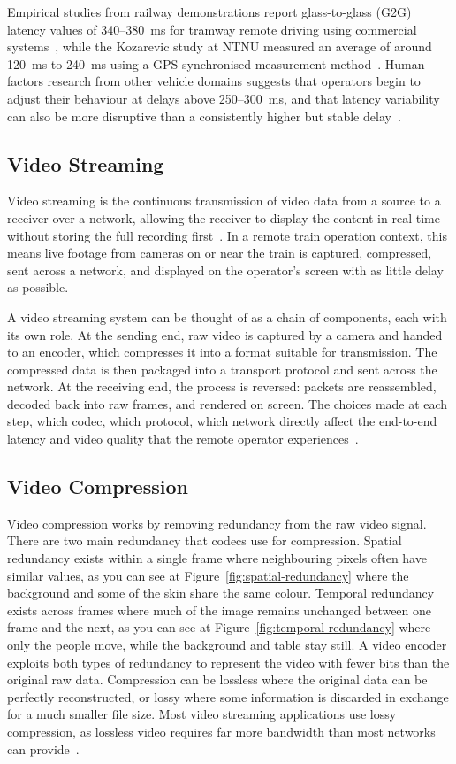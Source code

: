 Empirical studies from railway demonstrations report glass-to-glass (G2G) latency values of 340--380~ms for tramway remote driving using commercial systems~\cite{fp2r2dato2024d41_2}, while the Kozarevic study at NTNU measured an average of around 120~ms to 240~ms using a GPS-synchronised measurement method~\cite{kozarevic2025}. Human factors research from other vehicle domains suggests that operators begin to adjust their behaviour at delays above 250--300~ms, and that latency variability can also be more disruptive than a consistently higher but stable delay~\cite{myhrvold2025, neumeier2019}.

\subsection{Video Streaming}\label{sec:video-streaming}
Video streaming is the continuous transmission of video data from a source to a receiver over a network, allowing the receiver to display the content in real time without storing the full recording first~\cite{sodagar2011}. In a remote train operation context, this means live footage from cameras on or near the train is captured, compressed, sent across a network, and displayed on the operator's screen with as little delay as possible.
 
A video streaming system can be thought of as a chain of components, each with its own role. At the sending end, raw video is captured by a camera and handed to an encoder, which compresses it into a format suitable for transmission. The compressed data is then packaged into a transport protocol and sent across the network. At the receiving end, the process is reversed: packets are reassembled, decoded back into raw frames, and rendered on screen. The choices made at each step, which codec, which protocol, which network directly affect the end-to-end latency and video quality that the remote operator experiences~\cite{myhrvold2025, mejias2024}.

\subsection{Video Compression}\label{subsec:codecs}
Video compression works by removing redundancy from the raw video signal. There are two main redundancy that codecs use for compression. Spatial redundancy exists within a single frame where neighbouring pixels often have similar values, as you can see at Figure~\ref{fig:spatial-redundancy} where the background and some of the skin share the same colour. Temporal redundancy exists across frames where much of the image remains unchanged between one frame and the next, as you can see at Figure~\ref{fig:temporal-redundancy} where only the people move, while the background and table stay still. A video encoder exploits both types of redundancy to represent the video with fewer bits than the original raw data. Compression can be lossless where the original data can be perfectly reconstructed, or lossy where some information is discarded in exchange for a much smaller file size. Most video streaming applications use lossy compression, as lossless video requires far more bandwidth than most networks can provide~\cite{blomqvist2018, richardson2010}.

